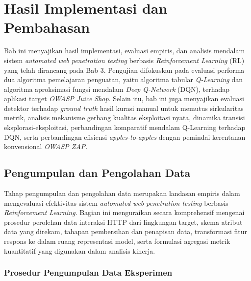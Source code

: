﻿\chapter{Hasil Implementasi dan Pembahasan}

Bab ini menyajikan hasil implementasi, evaluasi empiris, dan analisis mendalam sistem \textit{automated web penetration testing} berbasis \textit{Reinforcement Learning} (RL) yang telah dirancang pada Bab 3. Pengujian difokuskan pada evaluasi performa dua algoritma pemelajaran penguatan, yaitu algoritma tabular \textit{Q-Learning} dan algoritma aproksimasi fungsi mendalam \textit{Deep Q-Network} (DQN), terhadap aplikasi target \textit{OWASP Juice Shop}. Selain itu, bab ini juga menyajikan evaluasi detektor terhadap \textit{ground truth} hasil kurasi manual untuk memutus sirkularitas metrik, analisis mekanisme gerbang kualitas eksploitasi nyata, dinamika transisi eksplorasi-eksploitasi, perbandingan komparatif mendalam Q-Learning terhadap DQN, serta perbandingan efisiensi \textit{apples-to-apples} dengan pemindai kerentanan konvensional \textit{OWASP ZAP}.

\section{Pengumpulan dan Pengolahan Data}

Tahap pengumpulan dan pengolahan data merupakan landasan empiris dalam mengevaluasi efektivitas sistem \textit{automated web penetration testing} berbasis \textit{Reinforcement Learning}. Bagian ini menguraikan secara komprehensif mengenai prosedur perolehan data interaksi HTTP dari lingkungan target, skema atribut data yang direkam, tahapan pembersihan dan penapisan data, transformasi fitur respons ke dalam ruang representasi model, serta formulasi agregasi metrik kuantitatif yang digunakan dalam analisis kinerja.

\subsection{Prosedur Pengumpulan Data Eksperimen}

